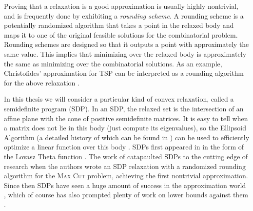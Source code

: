 Proving that a relaxation is a good approximation is usually highly nontrivial, and is frequently done by exhibiting a \emph{rounding scheme}. A rounding scheme is a potentially randomized  algorithm that takes a point in the relaxed body and maps it to one of the original feasible solutions for the combinatorial problem. Rounding schemes are designed so that it outputs a point with approximately the same value.  This implies that minimizing over the relaxed body is approximately the same as minimizing over the combinatorial solutions. As an example, Christofides' approximation for \textsc{TSP} \cite{Chri76} can be interpreted as a rounding algorithm for the above relaxation .

In this thesis we will consider a particular kind of convex relaxation, called a semidefinite program (SDP). In an SDP, the relaxed set is the intersection of an affine plane with the cone of positive semidefinite matrices.  It is easy to tell when a matrix does not lie in this body (just compute its eigenvalues), so the Ellipsoid Algorithm (a detailed history of which can be found in \cite{Akg84}) can be used to efficiently optimize a linear function over this body . SDPs first appeared in \cite{Lovasz79} in the form of the Lovasz Theta function . The work of \cite{GW95} catapaulted SDPs to the cutting edge of  research when the authors wrote an SDP relaxation with a randomized rounding algorithm for the \textsc{Max Cut} problem, achieving the first nontrivial  approximation.  Since then SDPs have seen a huge amount of success in the approximation world \cite{ARV09,TS15,PW07,Kar09,CMM09,Chlam07,FJ97,HZ99,Ragh08}, which of course has also prompted plenty of work on lower bounds against them \cite{BPZ15,LRS15,BCVVZ12,RS09,BDP15}.


